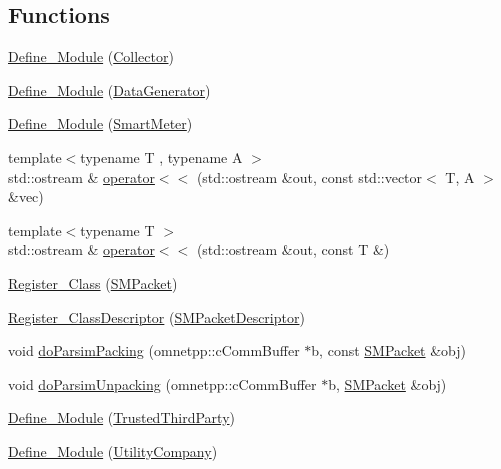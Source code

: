 \subsection*{Functions}
\begin{DoxyCompactItemize}
\item 
\hyperlink{namespacesmart3p_a0067060cf5f5fb419510d9902e680ae5}{Define\+\_\+\+Module} (\hyperlink{classsmart3p_1_1Collector}{Collector})
\item 
\hyperlink{namespacesmart3p_ae0f35b9f51bb320b6dc0f724b41889c0}{Define\+\_\+\+Module} (\hyperlink{classsmart3p_1_1DataGenerator}{Data\+Generator})
\item 
\hyperlink{namespacesmart3p_a4ffda917565781e4582e1ba536bfd103}{Define\+\_\+\+Module} (\hyperlink{classsmart3p_1_1SmartMeter}{Smart\+Meter})
\item 
{\footnotesize template$<$typename T , typename A $>$ }\\std\+::ostream \& \hyperlink{namespacesmart3p_a246a33bd787e27680c6cbddf141a48d4}{operator$<$$<$} (std\+::ostream \&out, const std\+::vector$<$ T, A $>$ \&vec)
\item 
{\footnotesize template$<$typename T $>$ }\\std\+::ostream \& \hyperlink{namespacesmart3p_a3270a6dc130a886b9e5a2ae79aa2dc49}{operator$<$$<$} (std\+::ostream \&out, const T \&)
\item 
\hyperlink{namespacesmart3p_a6784c09401baba4edc413e8e152520c3}{Register\+\_\+\+Class} (\hyperlink{classsmart3p_1_1SMPacket}{S\+M\+Packet})
\item 
\hyperlink{namespacesmart3p_a688f712691acb3e8426a0252eba1329a}{Register\+\_\+\+Class\+Descriptor} (\hyperlink{classsmart3p_1_1SMPacketDescriptor}{S\+M\+Packet\+Descriptor})
\item 
void \hyperlink{namespacesmart3p_a19be0dc0a5c4c1500e71c163b392d869}{do\+Parsim\+Packing} (omnetpp\+::c\+Comm\+Buffer $\ast$b, const \hyperlink{classsmart3p_1_1SMPacket}{S\+M\+Packet} \&obj)
\item 
void \hyperlink{namespacesmart3p_aaf72073ed0fb3822a7735f7d00cdc2b3}{do\+Parsim\+Unpacking} (omnetpp\+::c\+Comm\+Buffer $\ast$b, \hyperlink{classsmart3p_1_1SMPacket}{S\+M\+Packet} \&obj)
\item 
\hyperlink{namespacesmart3p_a81328fb4d9ad339c5dad6b7813ce9e29}{Define\+\_\+\+Module} (\hyperlink{classsmart3p_1_1TrustedThirdParty}{Trusted\+Third\+Party})
\item 
\hyperlink{namespacesmart3p_aa934e0c414152b03a9d6a2a3e6dc60eb}{Define\+\_\+\+Module} (\hyperlink{classsmart3p_1_1UtilityCompany}{Utility\+Company})
\end{DoxyCompactItemize}


